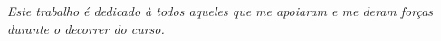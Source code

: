\begin{dedicatoria}
   \vspace*{\fill}
   \centering
   \noindent

   \textit{Este trabalho é dedicado à todos aqueles que me apoiaram e me deram forças durante o decorrer do curso.} \vspace*{\fill}
\end{dedicatoria}
